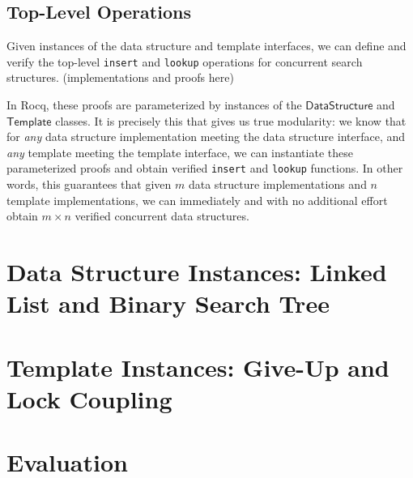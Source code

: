 \documentclass[sigplan,screen]{acmart}
\begin{document}
\subsection{Top-Level Operations}
Given instances of the data structure and template interfaces, we can define and verify the top-level \texttt{insert} and \texttt{lookup} operations for concurrent search structures. (implementations and proofs here)

In Rocq, these proofs are parameterized by instances of the $\mathsf{DataStructure}$ and $\mathsf{Template}$ classes. It is precisely this that gives us true modularity: we know that for \emph{any} data structure implementation meeting the data structure interface, and \emph{any} template meeting the template interface, we can instantiate these parameterized proofs and obtain verified \texttt{insert} and \texttt{lookup} functions. In other words, this guarantees that given $m$ data structure implementations and $n$ template implementations, we can immediately and with no additional effort obtain $m \times n$ verified concurrent data structures.

\section{Data Structure Instances: Linked List and Binary Search Tree}

\section{Template Instances: Give-Up and Lock Coupling}

\section{Evaluation}
\end{document}
